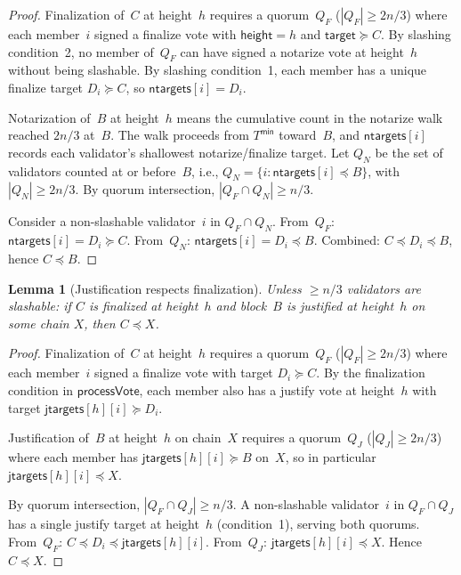 \documentclass{article}
\newcommand{\target}{\mathsf{target}}
\newcommand{\jtargets}{\mathsf{jtargets}}
\newcommand{\ntargets}{\mathsf{ntargets}}
\newcommand{\height}{\mathsf{height}}
\theoremstyle{plain}
\newtheorem{lemma}{Lemma}
\theoremstyle{definition}
\theoremstyle{remark}
\begin{document}
\begin{proof}
Finalization of~$C$ at height~$h$ requires a quorum~$Q_F$ ($|Q_F| \geq 2n/3$) where each member~$i$ signed a finalize vote with $\height = h$ and $\target \succeq C$.
By slashing condition~2, no member of~$Q_F$ can have signed a notarize vote at height~$h$ without being slashable.
By slashing condition~1, each member has a unique finalize target $D_i \succeq C$, so $\ntargets[i] = D_i$.

Notarization of~$B$ at height~$h$ means the cumulative count in the notarize walk reached $2n/3$ at~$B$.
The walk proceeds from $T^\mathsf{min}$ toward~$B$, and $\ntargets[i]$ records each validator's shallowest notarize/finalize target.
Let $Q_N$ be the set of validators counted at or before~$B$, i.e., $Q_N = \{i : \ntargets[i] \preceq B\}$, with $|Q_N| \geq 2n/3$.
By quorum intersection, $|Q_F \cap Q_N| \geq n/3$.

Consider a non-slashable validator~$i$ in $Q_F \cap Q_N$.
From~$Q_F$: $\ntargets[i] = D_i \succeq C$.
From~$Q_N$: $\ntargets[i] = D_i \preceq B$.
Combined: $C \preceq D_i \preceq B$, hence $C \preceq B$.
\end{proof}


\begin{lemma}[Justification respects finalization]\label{lem:tbd}
Unless $\geq n/3$ validators are slashable: if $C$ is finalized at height~$h$ and block~$B$ is justified at height~$h$ on some chain $X$, then $C \preceq X$.
\end{lemma}

\begin{proof}
Finalization of~$C$ at height~$h$ requires a quorum~$Q_F$ ($|Q_F| \geq 2n/3$) where each member~$i$ signed a finalize vote with target $D_i \succeq C$.
By the finalization condition in $\textsf{processVote}$, each member also has a justify vote at height~$h$ with target $\jtargets[h][i] \succeq D_i$.

Justification of~$B$ at height~$h$ on chain~$X$ requires a quorum~$Q_J$ ($|Q_J| \geq 2n/3$) where each member has $\jtargets[h][i] \succeq B$ on~$X$, so in particular $\jtargets[h][i] \preceq X$.

By quorum intersection, $|Q_F \cap Q_J| \geq n/3$.
A non-slashable validator~$i$ in $Q_F \cap Q_J$ has a single justify target at height~$h$ (condition~1), serving both quorums.
From~$Q_F$: $C \preceq D_i \preceq \jtargets[h][i]$.
From~$Q_J$: $\jtargets[h][i] \preceq X$.
Hence $C \preceq X$.
\end{proof}
\end{document}
